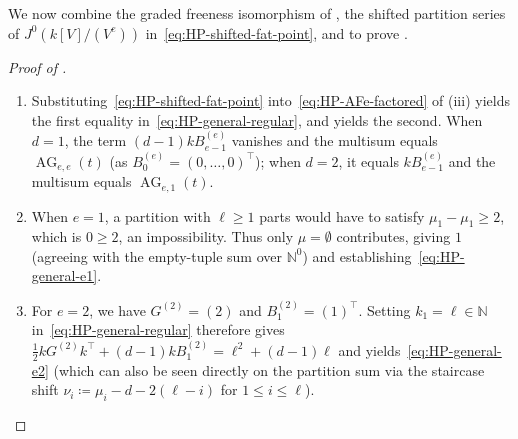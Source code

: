 \documentclass[a4paper, 12pt, reqno]{amsart}
\theoremstyle{remark}
\begin{document}
We now combine the graded freeness isomorphism of ,
the shifted partition series of $J^0(k[V]/(V^e))$ in~\eqref{eq:HP-shifted-fat-point},
and  to prove .

\begin{proof}[Proof of ]
  \begin{enumerate}
  \item Substituting~\eqref{eq:HP-shifted-fat-point} into~\eqref{eq:HP-AFe-factored} of (iii) yields the first equality in~\eqref{eq:HP-general-regular},
    and  yields the second.
    When $d = 1$,
    the term $(d - 1)kB^{(e)}_{e - 1}$ vanishes and the multisum equals $\operatorname{AG}_{e, e}(t)$ (as $B^{(e)}_0 = (0, \dots, 0)^\top$);
    when $d = 2$,
    it equals $kB^{(e)}_{e - 1}$ and the multisum equals $\operatorname{AG}_{e, 1}(t)$.
  \item When $e = 1$,
    a partition with $\ell \ge 1$ parts would have to satisfy $\mu_1 - \mu_1 \ge 2$,
    which is $0 \ge 2$,
    an impossibility.
    Thus only $\mu = \emptyset$ contributes,
    giving $1$ (agreeing with the empty-tuple sum over $\mathbb{N}^0$) and establishing~\eqref{eq:HP-general-e1}.
  \item For $e = 2$,
    we have $G^{(2)} = (2)$ and $B^{(2)}_1 = (1)^\top$.
    Setting $k_1 = \ell \in \mathbb{N}$ in~\eqref{eq:HP-general-regular} therefore gives $\frac{1}{2}k G^{(2)} k^\top + (d - 1)k B^{(2)}_1 = \ell^2 + (d - 1)\ell$ and yields~\eqref{eq:HP-general-e2}
    (which can also be seen directly on the partition sum via the staircase shift $\nu_i \coloneq \mu_i - d - 2(\ell - i)$ for $1 \le i \le \ell$).\qedhere
  \end{enumerate}
\end{proof}
\end{document}
